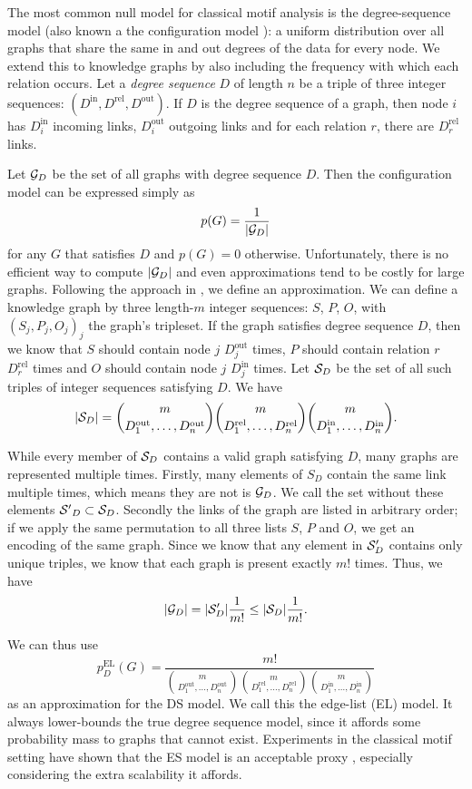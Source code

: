\documentclass[11pt]{article}
\newcommand{\G}{{\cal G}}
\begin{document}
The most common null model for classical motif analysis is the degree-sequence model (also known a the configuration model \cite{}): a uniform distribution over all graphs that share the same in and out degrees of the data for every node. We extend this to knowledge graphs by also including the frequency with which each relation occurs. Let a \emph{degree sequence} $D$ of length $n$ be a triple of three integer sequences: $(D^\text{in}, D^\text{rel}, D^\text{out})$. If $D$ is the degree sequence of a graph, then node $i$ has $D^\text{in}_i$ incoming links,  $D^\text{out}_i$ outgoing links and for each relation $r$, there are $D^\text{rel}_r$ links.

Let $\G_D$ be the set of all graphs with degree sequence $D$. Then the configuration model can be expressed simply as
\[
p(G) = \frac{1}{|\G_D|}
\]
for any $G$ that satisfies $D$ and $p(G) = 0$ otherwise. Unfortunately, there is no efficient way to compute $|\G_D|$ and even approximations tend to be costly for large graphs. Following the approach in \cite{bloem2017large}, we define an approximation. 
We can define a knowledge graph by three length-$m$ integer sequences: $S$, $P$, $O$, with ${(S_j, P_j, O_j)}_j$ the graph's tripleset. If the graph satisfies degree sequence $D$, then we know that $S$ should contain node $j$ $D^\text{out}_j$ times, $P$ should contain relation $r$ $D^\text{rel}_r$ times and $O$ should contain node $j$ $D^\text{in}_j$ times.  Let ${\cal S}_D$ be the set of all such triples of integer sequences satisfying $D$. We have 
\[
|{\cal S}_D| =
 {m \choose {D_1^\text{out}, \ldots, D_n^\text{out}} }
 {m \choose {D_1^\text{rel}, \ldots, D_n^\text{rel}} }
 {m \choose {D_1^\text{in}, \ldots, D_n^\text{in}} } \text{.}
\]

While every member of ${\cal S}_D$ contains a valid graph satisfying $D$, many graphs are represented multiple times. Firstly, many elements of ${S}_D$ contain the same link multiple times, which means they are not is ${\cal G}_D$. We call the set without these elements ${\cal S'}_D \subset {\cal S}_D$. Secondly the links of the graph are listed in arbitrary order; if we apply the same permutation to all three lists $S$, $P$ and $O$, we get an encoding of the same graph. Since we know that any element in ${\cal S}'_D$ contains only unique triples, we know that each graph is present exactly $m!$ times. Thus, we have
\[
|\G_D| = |{\cal S}'_D| \frac{1}{m!} \leq  |{\cal S}_D| \frac{1}{m!} \text{.}
\]

We can thus use 
\[
p^\text{EL}_D(G) =  \frac{m!}{{m \choose {D_1^\text{out}, \ldots, D_n^\text{out}} }
 {m \choose {D_1^\text{rel}, \ldots, D_n^\text{rel}} }
 {m \choose {D_1^\text{in}, \ldots, D_n^\text{in}} }}
\]
as an approximation for the DS model. We call this the edge-list (EL) model. It always lower-bounds the true degree sequence model, since it affords some probability mass to graphs that cannot exist. \footnotemark Experiments in the classical motif setting have shown that the ES model is an acceptable proxy \cite{bloem2017large}, especially considering the extra scalability it affords.
\end{document}
